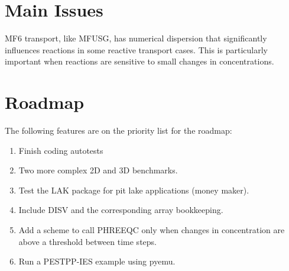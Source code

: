 \documentclass{article}
\begin{document}
\section{Main Issues}
MF6 transport, like MFUSG, has numerical dispersion that significantly influences reactions in some reactive transport cases. This is particularly important when reactions are sensitive to small changes in concentrations.
\section{Roadmap}

The following features are on the priority list for the roadmap:

\begin{enumerate}
    \item Finish coding autotests
    \item Two more complex 2D and 3D benchmarks.
    \item Test the LAK package for pit lake applications (money maker).
    \item Include DISV and the corresponding array bookkeeping.
    \item Add a scheme to call PHREEQC only when changes in concentration are above a threshold between time steps.
    \item Run a PESTPP-IES example using pyemu.
\end{enumerate}
\end{document}
